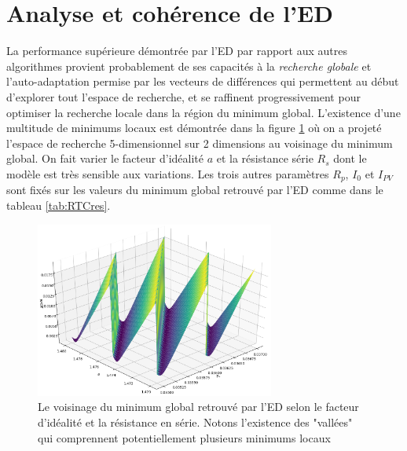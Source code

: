 \section{Analyse et cohérence de l'ED}

La performance supérieure démontrée par l'ED par rapport aux autres algorithmes provient probablement de ses capacités à la \textit{recherche globale} et l'auto-adaptation permise par les vecteurs de différences qui permettent au début d'explorer tout l'espace de recherche, et se raffinent progressivement pour optimiser la recherche locale dans la région du minimum global. L'existence d'une multitude de minimums locaux est démontrée dans la figure \ref{fig:neigh} où on a projeté l'espace de recherche 5-dimensionnel sur 2 dimensions au voisinage du minimum global. On fait varier le facteur d'idéalité $a$ et la résistance série $R_s$ dont le modèle est très sensible aux variations. Les trois autres paramètres $R_{p}$, $I_0$ et $I_{PV}$ sont fixés sur les valeurs du minimum global retrouvé par l'ED comme dans le tableau \ref{tab:RTCres}.

\begin{figure}
  \begin{center}
    \includegraphics[width=0.7\textwidth]{resources/RTCFrance/singled/neighborhood.png}
    \caption{Le voisinage du minimum global retrouvé par l'ED selon le facteur d'idéalité et la résistance en série. Notons l'existence des "vallées" qui comprennent potentiellement plusieurs minimums locaux}
    \label{fig:neigh}
  \end{center}
\end{figure}

